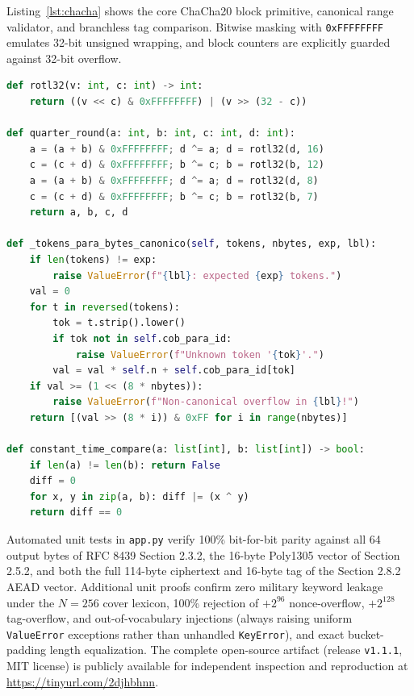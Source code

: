 \documentclass[conference]{IEEEtran}
\begin{document}
Listing~\ref{lst:chacha} shows the core ChaCha20 block primitive, canonical range validator, and branchless tag comparison. Bitwise masking with \texttt{0xFFFFFFFF} emulates 32-bit unsigned wrapping, and block counters are explicitly guarded against 32-bit overflow.

\begin{lstlisting}[language=Python, caption={Pure-Python ChaCha20 Core, Canonical Range Check, and Constant-Time Tag Comparison}, label={lst:chacha}]
def rotl32(v: int, c: int) -> int:
    return ((v << c) & 0xFFFFFFFF) | (v >> (32 - c))

def quarter_round(a: int, b: int, c: int, d: int):
    a = (a + b) & 0xFFFFFFFF; d ^= a; d = rotl32(d, 16)
    c = (c + d) & 0xFFFFFFFF; b ^= c; b = rotl32(b, 12)
    a = (a + b) & 0xFFFFFFFF; d ^= a; d = rotl32(d, 8)
    c = (c + d) & 0xFFFFFFFF; b ^= c; b = rotl32(b, 7)
    return a, b, c, d

def _tokens_para_bytes_canonico(self, tokens, nbytes, exp, lbl):
    if len(tokens) != exp:
        raise ValueError(f"{lbl}: expected {exp} tokens.")
    val = 0
    for t in reversed(tokens):
        tok = t.strip().lower()
        if tok not in self.cob_para_id:
            raise ValueError(f"Unknown token '{tok}'.")
        val = val * self.n + self.cob_para_id[tok]
    if val >= (1 << (8 * nbytes)):
        raise ValueError(f"Non-canonical overflow in {lbl}!")
    return [(val >> (8 * i)) & 0xFF for i in range(nbytes)]

def constant_time_compare(a: list[int], b: list[int]) -> bool:
    if len(a) != len(b): return False
    diff = 0
    for x, y in zip(a, b): diff |= (x ^ y)
    return diff == 0
\end{lstlisting}

Automated unit tests in \texttt{app.py} verify 100\% bit-for-bit parity against all 64 output bytes of RFC 8439 Section 2.3.2, the 16-byte Poly1305 vector of Section 2.5.2, and both the full 114-byte ciphertext and 16-byte tag of the Section 2.8.2 AEAD vector. Additional unit proofs confirm zero military keyword leakage under the $N=256$ cover lexicon, 100\% rejection of $+2^{96}$ nonce-overflow, $+2^{128}$ tag-overflow, and out-of-vocabulary injections (always raising uniform \texttt{ValueError} exceptions rather than unhandled \texttt{KeyError}), and exact bucket-padding length equalization. The complete open-source artifact (release \texttt{v1.1.1}, MIT license) is publicly available for independent inspection and reproduction at \url{https://tinyurl.com/2djhbhnn}.
\end{document}
